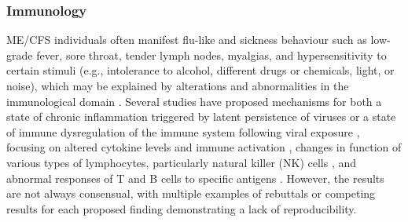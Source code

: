 \subsubsection{Immunology}

ME/CFS individuals often manifest flu-like and sickness behaviour such as low-grade fever, sore throat, tender lymph nodes, myalgias, and hypersensitivity to certain stimuli (e.g., intolerance to alcohol, different drugs or chemicals, light, or noise), which may be explained by alterations and abnormalities in the immunological domain \citep{underhill2015MyalgicEncephalomyelitis}.
Several studies have proposed mechanisms for both a state of chronic inflammation triggered by latent persistence of viruses or a state of immune dysregulation of the immune system following viral exposure \citep{natelson2002EvidencePresence, brenuImmunologicalAbnormalitiesPotential2011}, focusing on altered cytokine levels and immune activation \citep{patarca2001CytokinesChronic, tomoda2005CytokineProduction, lorussoImmunologicalAspectsChronic2009}, changes in function of various types of lymphocytes, particularly natural killer (NK) cells \citep{klimas1990ImmunologicAbnormalitiesa}, and abnormal responses of T and B cells to specific antigens \citep{lorussoImmunologicalAspectsChronic2009, brenu2014RoleAdaptive, rivasAssociationNKCell2018}.
However, the results are not always consensual, with multiple examples of rebuttals or competing results for each proposed finding demonstrating a lack of reproducibility. 


